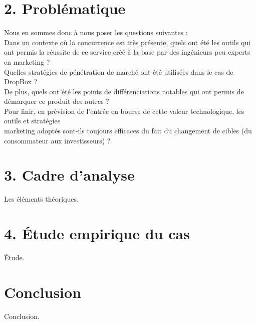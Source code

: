 \documentclass[a4paper, 10pt]{article}
\begin{document}
\section*{2. Probl\'ematique}
Nous en sommes donc \`a nous poser les questions suivantes :\\
Dans un contexte o\`u la concurrence est tr\`es pr\'esente, quels ont \'et\'e les outils qui ont permis la r\'eussite de ce service
cr\'e\'e \`a la base par des ing\'enieurs peu experts en marketing ?\\
Quelles strat\'egies de p\'en\'etration de march\'e ont \'et\'e utilis\'ees dans le cas de DropBox ?\\
De plus, quels ont \'et\'e les points de diff\'erenciations notables qui ont permis de d\'emarquer ce produit des autres ?\\
Pour finir, en pr\'evision de l'entr\'ee en bourse de cette valeur technologique,
les outils et strat\'egies\\marketing adopt\'es sont-ils toujours efficaces du fait du changement de cibles
(du consommateur aux investisseurs) ?

\section*{3. Cadre d'analyse}
Les éléments théoriques.

\section*{4. Étude empirique du cas}
Étude.

\section*{Conclusion}
Conclusion.
\end{document}
